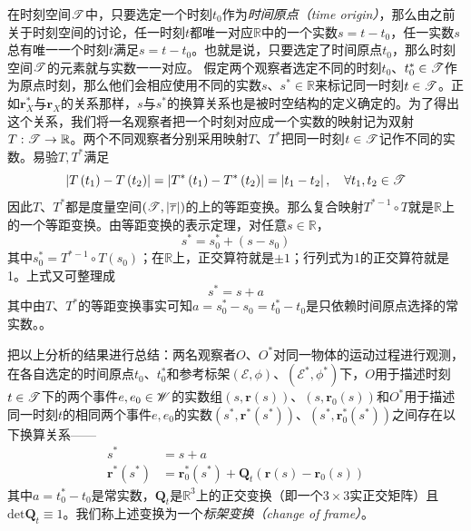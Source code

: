 \documentclass[main.tex]{subfiles}
\begin{document}
在时刻空间$\mathscr{T}$中，只要选定一个时刻$t_0$作为\emph{时间原点（time origin）}，那么由之前关于时刻空间的讨论，任一时刻$t$都唯一对应$\mathbb{R}$中的一个实数$s=t-t_0$，任一实数$s$总有唯一一个时刻$t$满足$s=t-t_0$。也就是说，只要选定了时间原点$t_0$，那么时刻空间$\mathscr{T}$的元素就与实数一一对应。
假定两个观察者选定不同的时刻$t_0$、$t_0^*\in\mathscr{T}$作为原点时刻，那么他们会相应使用不同的实数$s$、$s^*\in\mathbb{R}$来标记同一时刻$t\in\mathscr{T}$。正如$\mathbf{r}^*_X$与$\mathbf{r}_X$的关系那样，$s$与$s^*$的换算关系也是被时空结构的定义确定的。为了得出这个关系，我们将一名观察者把一个时刻对应成一个实数的映射记为双射$T:\mathscr{T}\rightarrow\mathbb{R}$。两个不同观察者分别采用映射$T$、$T^*$把同一时刻$t\in\mathscr{T}$记作不同的实数。易验$T,T^*$满足
\[\left|T\left(t_1\right)-T\left(t_2\right)\right|=\left|T^*\left(t_1\right)-T^*\left(t_2\right)\right|=\left|t_1-t_2\right|,\quad\forall t_1,t_2\in\mathscr{T}\]
因此$T$、$T^*$都是度量空间$\left(\mathscr{T},\left|\overline{\tau}\right|\right)$的上的等距变换。那么复合映射$T^{*-1}\circ T$就是$\mathbb{R}$上的一个等距变换。由等距变换的表示定理，对任意$s\in\mathbb{R}$，
\[s^*=s_0^*+\left(s-s_0\right)\]
其中$s_0^*=T^{*-1}\circ T\left(s_0\right)$；在$\mathbb{R}$上，正交算符就是$\pm 1$；行列式为1的正交算符就是1。上式又可整理成
\[s^*=s+a\]
其中由$T$、$T^*$的等距变换事实可知$a=s_0^*-s_0=t_0^*-t_0$是只依赖时间原点选择的常实数。。

把以上分析的结果进行总结：两名观察者$O$、$O^*$对同一物体的运动过程进行观测，在各自选定的时间原点$t_0$、$t_0^*$和参考标架$\left(\mathcal{E},\phi\right)$、$\left(\mathcal{E}^*,\phi^*\right)$下，$O$用于描述时刻$t\in\mathscr{T}$下的两个事件$e,e_0\in\mathscr{W}$的实数组$\left(s,\mathbf{r}\left(s\right)\right)$、$\left(s,\mathbf{r}_0\left(s\right)\right)$和$O^*$用于描述同一时刻$t$的相同两个事件$e,e_0$的实数$\left(s^*,\mathbf{r}^*\left(s^*\right)\right)$、$\left(s^*,\mathbf{r}^*_0\left(s^*\right)\right)$之间存在以下换算关系——
\begin{align*}
    s^*                          & =s+a                                                                                                         \\
    \mathbf{r}^*\left(s^*\right) & =\mathbf{r}_0^*\left(s^*\right)+\mathbf{Q}_t\left(\mathbf{r}\left(s\right)-\mathbf{r}_0\left(s\right)\right)
\end{align*}
其中$a=t_0^*-t_0$是常实数，$\mathbf{Q}_t$是$\mathbb{R}^3$上的正交变换（即一个$3\times 3$实正交矩阵）且$\mathrm{det}\mathbf{Q}_t\equiv 1$。我们称上述变换为一个\emph{标架变换（change of frame）}。
\end{document}
